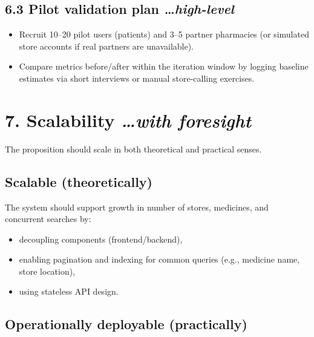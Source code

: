 \documentclass[
]{article}
\begin{document}
\subsection{\texorpdfstring{\textbf{6.3 Pilot validation plan}
\emph{\ldots high-level}}{6.3 Pilot validation plan \ldots high-level}}\label{pilot-validation-plan-high-level}

\begin{itemize}
\item
  Recruit 10--20 pilot users (patients) and 3--5 partner pharmacies (or
  simulated store accounts if real partners are unavailable).
\item
  Compare metrics before/after within the iteration window by logging
  baseline estimates via short interviews or manual store-calling
  exercises.
\end{itemize}

\section{\texorpdfstring{\textbf{7. Scalability} \emph{\ldots with
foresight}}{7. Scalability \ldots with foresight}}\label{scalability-with-foresight}

The proposition should scale in both theoretical and practical senses.

\subsection{\texorpdfstring{\textbf{Scalable
(theoretically)}}{Scalable (theoretically)}}\label{scalable-theoretically}

The system should support growth in number of stores, medicines, and
concurrent searches by:

\begin{itemize}
\item
  decoupling components (frontend/backend),
\item
  enabling pagination and indexing for common queries (e.g., medicine
  name, store location),
\item
  using stateless API design.
\end{itemize}

\subsection{\texorpdfstring{\textbf{Operationally deployable
(practically)}}{Operationally deployable (practically)}}\label{operationally-deployable-practically}
\end{document}
